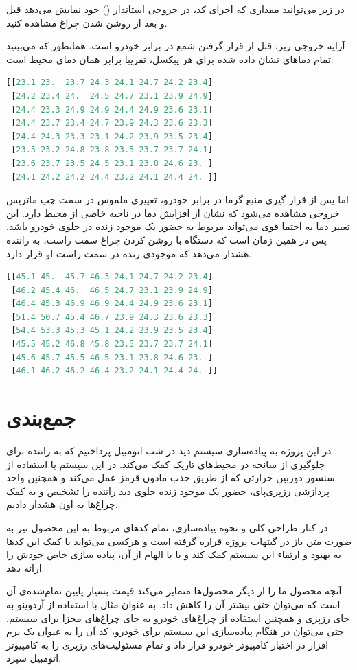 در زیر می‌توانید مقداری که اجرای کد، در خروجی استاندار () خود نمایش می‌دهد قبل و بعد از روشن شدن چراغ مشاهده کنید.


آرایه خروجی زیر، قبل از قرار گرفتن شمع در برابر خودرو است. همانطور که می‌بینید تمام دماها‌ی نشان داده شده برای هر پیکسل، تقریبا برابر همان دمای محیط است.
\begin{latin}
\begin{lstlisting}[language=python]
[[23.1 23.  23.7 24.3 24.1 24.7 24.2 23.4]
 [24.2 23.4 24.  24.5 24.7 23.1 23.9 24.9]
 [24.4 23.3 24.9 24.9 24.4 24.9 23.6 23.1]
 [24.4 23.7 23.4 24.7 23.9 24.3 23.6 23.3]
 [24.4 24.3 23.3 23.1 24.2 23.9 23.5 23.4]
 [23.5 23.2 24.8 23.8 23.5 23.7 23.7 24.1]
 [23.6 23.7 23.5 24.5 23.1 23.8 24.6 23. ]
 [24.1 24.2 24.2 24.4 23.2 24.1 24.4 24. ]]
\end{lstlisting}
\end{latin}

اما پس از قرار گیری منبع گرما در برابر خودرو، تغییری ملموس در سمت چپ ماتریس خروجی مشاهده می‌شود که نشان از افزایش دما در ناحیه خاصی از محیط دارد. این تغییر دما به احتما قوی می‌تواند مربوط به حضور یک موجود زنده در جلوی خودرو باشد. پس در همین زمان است که دستگاه با روشن کردن چراغ سمت راست، به راننده هشدار می‌دهد که موجودی زنده در سمت راست او قرار دارد.
\begin{latin}
\begin{lstlisting}[language=python]
[[45.1 45.  45.7 46.3 24.1 24.7 24.2 23.4]
 [46.2 45.4 46.  46.5 24.7 23.1 23.9 24.9]
 [46.4 45.3 46.9 46.9 24.4 24.9 23.6 23.1]
 [51.4 50.7 45.4 46.7 23.9 24.3 23.6 23.3]
 [54.4 53.3 45.3 45.1 24.2 23.9 23.5 23.4]
 [45.5 45.2 46.8 45.8 23.5 23.7 23.7 24.1]
 [45.6 45.7 45.5 46.5 23.1 23.8 24.6 23. ]
 [46.1 46.2 46.2 46.4 23.2 24.1 24.4 24. ]]
\end{lstlisting}
\end{latin}



\chapter{جمع‌بندی}
در این پروژه به پیاده‌سازی سیستم دید در شب اتومبیل پرداختیم که به راننده برای جلوگیری از سانحه در محیط‌های تاریک کمک می‌کند. در این سیستم با استفاده از سنسور دوربین حرارتی که از طریق جذب مادون قرمز عمل می‌کند و همچنین واحد پردازشی رزپری‌پای، حضور یک موجود زنده جلوی دید راننده را تشخیص و به کمک چرا‌غ‌ها به اون هشدار دادیم. 

در کنار طراحی کلی و نحوه پیاده‌سازی، تمام کد‌های مربوط به این محصول نیز به صورت متن باز در گیتهاب پروژه قراره گرفته است و هرکسی می‌تواند با کمک این کدها به بهبود و ارتقاء این سیستم کمک کند و یا با الهام از آن، پیاده سازی خاص خودش را ارائه دهد. 

آنچه محصول ما را از دیگر محصول‌ها متمایز می‌کند قیمت بسیار پایین تمام‌شده‌ی ‌آن است که می‌توان حتی بیشتر آن را کاهش داد. به عنوان مثال با استفاده از آردوینو به جای رزپری و همچنین استفاده از چراغ‌های خودرو به جای چراغ‌های مجزا برای سیستم. حتی می‌توان در هنگام پیاده‌سازی این سیستم برای خودرو، کد آن را به عنوان یک نرم افزار در اختیار کامپیوتر خودرو قرار داد و تمام مسئولیت‌های رزپری را به کامپیوتر اتومبیل سپرد.